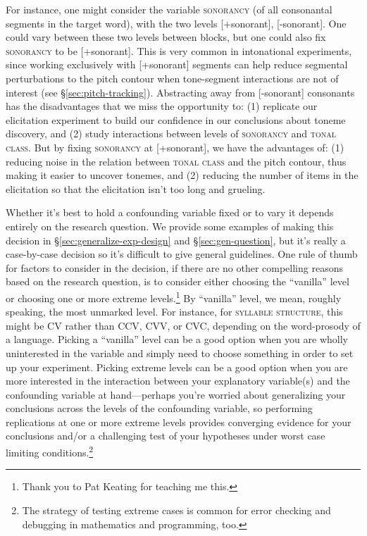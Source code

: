 \documentclass[12pt]{article}
\begin{document}
For instance, one might consider the variable \textsc{sonorancy} (of all
consonantal segments in the target word), with the
two levels [+sonorant], [-sonorant]. One could vary between these two
levels between blocks, but one could also fix \textsc{sonorancy} to be
[+sonorant]. This is very common in intonational experiments, since
working exclusively with [+sonorant] segments can help reduce
segmental perturbations to the pitch contour when tone-segment
interactions are not of interest (see
\S\ref{sec:pitch-tracking}). Abstracting away from [-sonorant]
consonants has the disadvantages that we miss the opportunity to: (1) replicate our elicitation experiment to build our confidence in our
conclusions about toneme discovery, and (2) study interactions
between levels of \textsc{sonorancy} and \textsc{tonal class}. But by
fixing \textsc{sonorancy} at [+sonorant], we have the advantages of:
(1) reducing noise in the relation between \textsc{tonal class} and
the pitch contour, thus making it easier to uncover tonemes, and (2)
reducing the number of items in the elicitation so that the
elicitation isn't too long and grueling. 

Whether it's best to hold a
confounding variable fixed or to vary it depends entirely on the research
question. We provide some examples of making this decision in
\S\ref{sec:generalize-exp-design} and \S\ref{sec:gen-question}, but
it's really a case-by-case decision so it's difficult to give general
guidelines. One rule of thumb for factors to consider in the decision,
if there are no other compelling reasons based on the research
question, is to consider either choosing the ``vanilla'' level or
choosing one or more extreme levels.\footnote{Thank you to Pat
  Keating for teaching me this.} By ``vanilla'' level, we mean,
roughly speaking, the most unmarked level. For instance, for
\textsc{syllable structure}, this might be CV rather than CCV, CVV, or
CVC, depending on the word-prosody of a language. Picking a
``vanilla'' level can be a good option when you are wholly uninterested
in the variable and simply need to choose something in order to set up
your experiment. Picking extreme
levels can be a good option when you are more interested in the
interaction between your explanatory variable(s) and the confounding
variable at hand---perhaps you're worried about generalizing your
conclusions across the levels of the confounding variable, so
performing replications at one or more extreme levels provides
converging evidence for your conclusions and/or a challenging test of your
hypotheses under worst case limiting conditions.\footnote{The
  strategy of testing extreme cases is common for error checking and
  debugging in mathematics and programming, too.}
\end{document}
